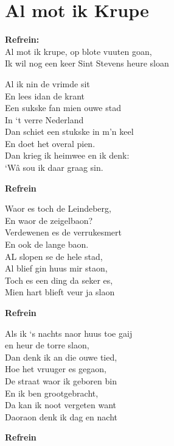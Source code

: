 \section{Al mot ik Krupe}
\textbf{Refrein:}\\
Al mot ik krupe, op blote vuuten goan,\\
Ik wil nog een keer Sint Stevens heure sloan

Al ik nin de vrimde sit\\
En lees idan de krant\\
Een sukske fan mien ouwe stad\\
In ‘t verre Nederland\\
Dan schiet een stukske in m’n keel\\
 En doet het overal pien.\\
Dan krieg ik heimwee en ik denk:\\
‘Wâ sou ik daar graag sin.

\textbf{Refrein}

Waor es toch de Leindeberg,\\
En waor de zeigelbaon?\\
Verdewenen es de verrukesmert\\
En ook de lange baon.\\
AL slopen se de hele stad,\\
Al blief gin huus mir staon,\\
Toch es een ding da seker es,\\
Mien hart blieft veur ja slaon

\textbf{Refrein}

Als ik ‘s nachts naor huus toe gaij\\
en heur de torre slaon,\\
Dan denk ik an die ouwe tied,\\
Hoe het vruuger es gegaon,\\
De straat waor ik geboren bin\\
En ik ben grootgebracht,\\
Da kan ik noot vergeten want\\
Daoraon denk ik dag en nacht

\textbf{Refrein}
